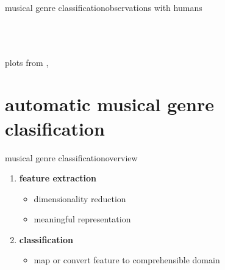 \begin{frame}{musical genre classification}{observations with humans}
\begin{columns}
\begin{figure}
{                            }
                    \end{figure}
            \end{columns}
            \begin{flushright}plots from ,\end{flushright}
        \end{frame}
    
    \section[MGC]{automatic musical genre clasification}

        \begin{frame}{musical genre classification}{overview}
            
            \begin{enumerate}
                    \item	\textbf{feature extraction}
                            \begin{itemize}
                                \item 	dimensionality reduction
                                \item	meaningful representation
                            \end{itemize}
                    \bigskip
                    \item<2->	\textbf{classification}
                            \begin{itemize}
                                \item	map or convert feature to comprehensible domain
                            \end{itemize}
            \end{enumerate}
        \end{frame}

